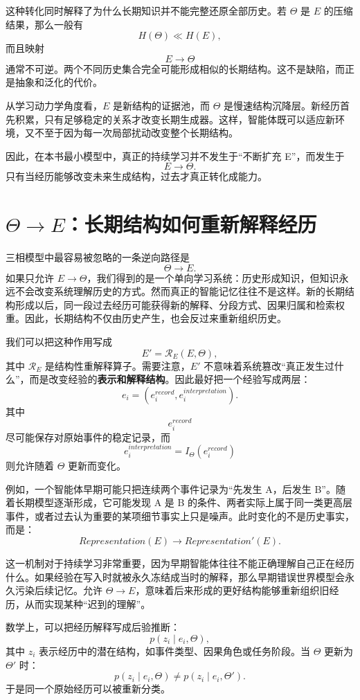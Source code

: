 这种转化同时解释了为什么长期知识并不能完整还原全部历史。若 $\Theta$ 是 $E$ 的压缩结果，那么一般有
\[
H(\Theta)
\ll
H(E),
\]
而且映射
\[
E\rightarrow\Theta
\]
通常不可逆。两个不同历史集合完全可能形成相似的长期结构。这不是缺陷，而正是抽象和泛化的代价。

从学习动力学角度看，$E$ 是新结构的证据池，而 $\Theta$ 是慢速结构沉降层。新经历首先积累，只有足够稳定的关系才改变长期生成器。这样，智能体既可以适应新环境，又不至于因为每一次局部扰动改变整个长期结构。

因此，在本书最小模型中，真正的持续学习并不发生于“不断扩充 E”，而发生于
\[
\boxed{
E\rightarrow\Theta.
}
\]
只有当经历能够改变未来生成结构，过去才真正转化成能力。

\section{$\Theta\rightarrow E$：长期结构如何重新解释经历}

三相模型中最容易被忽略的一条逆向路径是
\[
\boxed{
\Theta\rightarrow E.
}
\]
如果只允许 $E\rightarrow\Theta$，我们得到的是一个单向学习系统：历史形成知识，但知识永远不会改变系统理解历史的方式。然而真正的智能记忆往往不是这样。新的长期结构形成以后，同一段过去经历可能获得新的解释、分段方式、因果归属和检索权重。因此，长期结构不仅由历史产生，也会反过来重新组织历史。

我们可以把这种作用写成
\[
E'
=
\mathcal R_E
\left(
E,\Theta
\right),
\]
其中 $\mathcal R_E$ 是结构性重解释算子。需要注意，$E'$ 不意味着系统篡改“真正发生过什么”，而是改变经验的\textbf{表示和解释结构}。因此最好把一个经验写成两层：
\[
e_i
=
\left(
e_i^{record},
e_i^{interpretation}
\right).
\]
其中
\[
e_i^{record}
\]
尽可能保存对原始事件的稳定记录，而
\[
e_i^{interpretation}
=
I_\Theta(e_i^{record})
\]
则允许随着 $\Theta$ 更新而变化。

例如，一个智能体早期可能只把连续两个事件记录为“先发生 A，后发生 B”。随着长期模型逐渐形成，它可能发现 A 是 B 的条件、两者实际上属于同一类更高层事件，或者过去认为重要的某项细节事实上只是噪声。此时变化的不是历史事实，而是：
\[
Representation(E)
\rightarrow
Representation'(E).
\]

这一机制对于持续学习非常重要，因为早期智能体往往不能正确理解自己正在经历什么。如果经验在写入时就被永久冻结成当时的解释，那么早期错误世界模型会永久污染后续记忆。允许 $\Theta\rightarrow E$，意味着后来形成的更好结构能够重新组织旧经历，从而实现某种“迟到的理解”。

数学上，可以把经历解释写成后验推断：
\[
p(z_i\mid e_i,\Theta),
\]
其中 $z_i$ 表示经历中的潜在结构，如事件类型、因果角色或任务阶段。当 $\Theta$ 更新为 $\Theta'$ 时：
\[
p(z_i\mid e_i,\Theta)
\neq
p(z_i\mid e_i,\Theta').
\]
于是同一个原始经历可以被重新分类。

